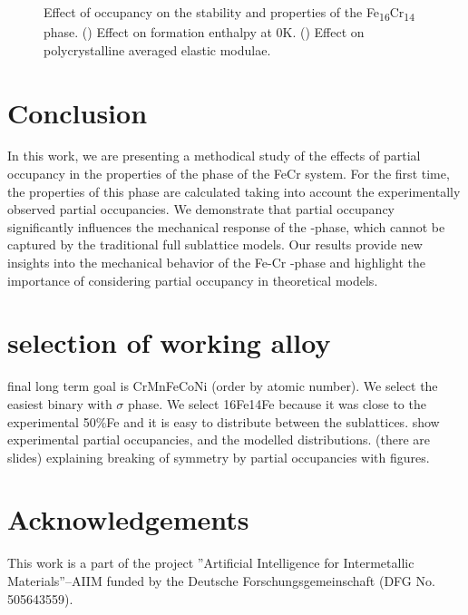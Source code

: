 \documentclass[superscriptaddress, 12pt]{revtex4-2}%
\begin{document}
\begin{figure}
 \caption{\protect\label{fig:OccupancyEffect}
  Effect of occupancy on the stability and properties of the Fe\textsubscript{16}Cr\textsubscript{14} \textsigma\-phase.
   () Effect on formation enthalpy at 0K.
   () Effect on polycrystalline  averaged elastic modulae.
 }

\end{figure}

\section{Conclusion}
In this work, we are presenting a methodical study of the effects of partial occupancy in the properties of the \textsigma phase of the FeCr system.
For the first time, the properties of this phase are calculated taking into account the experimentally observed partial occupancies.
We demonstrate that partial occupancy significantly influences the mechanical response of the \textsigma-phase, which cannot be captured by the traditional full sublattice models.
Our results provide new insights into the mechanical behavior of the Fe-Cr \textsigma-phase and highlight the importance of considering partial occupancy in theoretical models.

\section{selection of working alloy}
final long term goal is CrMnFeCoNi (order by atomic number).
We select the easiest binary with $\sigma$ phase.
We select 16Fe14Fe because it was close to the experimental 50\%Fe and it is easy to distribute between the sublattices.
show experimental partial occupancies, and the modelled distributions.
(there are slides)
explaining breaking of symmetry by partial occupancies with figures.

\section*{Acknowledgements} 

This work is a part of the project ”Artificial Intelligence for Intermetallic Materials”–AIIM funded by the Deutsche Forschungsgemeinschaft (DFG No. 505643559). 
 
\end{document}
